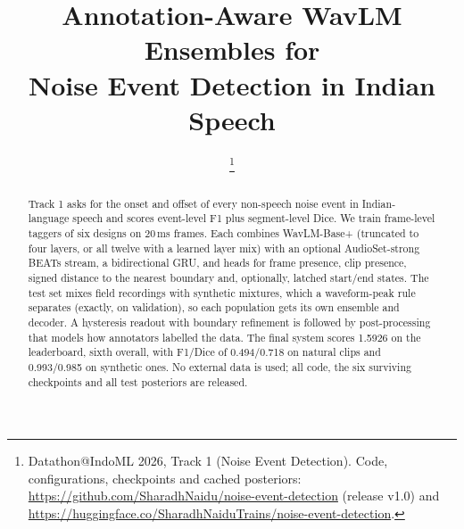 \documentclass[conference,10pt]{IEEEtran}
\begin{document}
\title{Annotation-Aware WavLM Ensembles for\\Noise Event Detection in Indian Speech}

\author{
\thanks{Datathon@IndoML 2026, Track 1 (Noise Event Detection). Code, configurations, checkpoints and cached posteriors: \url{https://github.com/SharadhNaidu/noise-event-detection} (release v1.0) and \url{https://huggingface.co/SharadhNaiduTrains/noise-event-detection}.}}

\maketitle

\begin{abstract}
Track 1 asks for the onset and offset of every non-speech noise event in Indian-language speech and scores event-level F1 plus segment-level Dice. We train frame-level taggers of six designs on 20\,ms frames. Each combines WavLM-Base+ (truncated to four layers, or all twelve with a learned layer mix) with an optional AudioSet-strong BEATs stream, a bidirectional GRU, and heads for frame presence, clip presence, signed distance to the nearest boundary and, optionally, latched start/end states. The test set mixes field recordings with synthetic mixtures, which a waveform-peak rule separates (exactly, on validation), so each population gets its own ensemble and decoder. A hysteresis readout with boundary refinement is followed by post-processing that models how annotators labelled the data. The final system scores 1.5926 on the leaderboard, sixth overall, with F1/Dice of 0.494/0.718 on natural clips and 0.993/0.985 on synthetic ones. No external data is used; all code, the six surviving checkpoints and all test posteriors are released.
\end{abstract}
\end{document}
